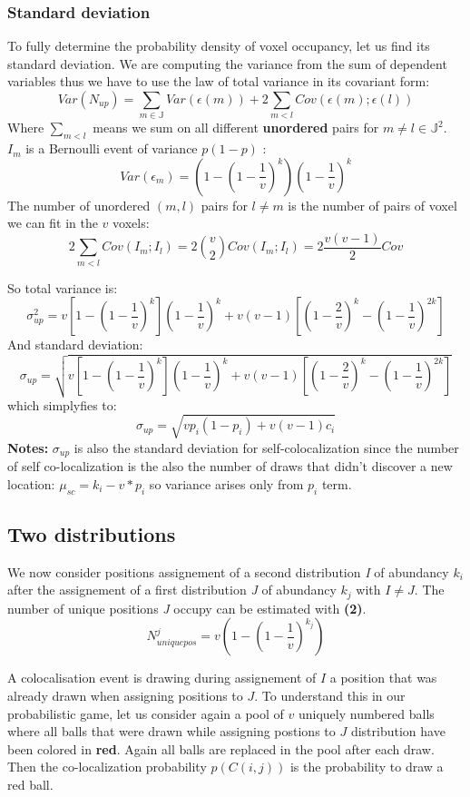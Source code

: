 \documentclass{article}
\begin{document}
\subsubsection{Standard deviation}
To fully determine the probability density of voxel occupancy, let us find its standard deviation. We are computing the variance from the sum of dependent variables
thus we have to use the law of total variance in its covariant form:
\[
Var(N_{up}) = \sum_{m \in \mathbb{J}} Var(\epsilon(m)) +  2\sum_{m < l }Cov(\epsilon(m);\epsilon(l))
\]
Where $\sum_{m<l}$ means we sum on all different \textbf{unordered} pairs for $m \neq l \in \mathbb{J}^2$.\newline
$I_m$ is a Bernoulli event of variance $p(1-p)$ :
\[
Var(\epsilon_m) = (1-(1-\frac{1}{v})^k)(1-\frac{1}{v})^k
\]
The number of unordered $(m,l)$ pairs for $l \neq m$ is the number of pairs of voxel we can fit in the $v$ voxels: 
\[
    2\sum_{m < l }Cov(I_m;I_l) = 2\binom{v}{2}Cov(I_m;I_l) = 2\frac{v(v-1)}{2}Cov 
\]

So total variance is:
\[
    \sigma^2_{up} = v[1-{(1-\frac{1}{v})}^k]{(1-\frac{1}{v})}^k + v(v-1)[(1-\frac{2}{v})^k - (1-\frac{1}{v})^{2k}]
\]
And standard deviation:
\[
    \sigma_{up} = \sqrt{v[1-{(1-\frac{1}{v})}^k]{(1-\frac{1}{v})}^k + v(v-1)[(1-\frac{2}{v})^k - (1-\frac{1}{v})^{2k}]}
\]
which simplyfies to:
\begin{equation}
    \sigma_{up} = \sqrt{vp_i(1-p_i) + v(v-1)c_i}
\end{equation}
\textbf{Notes:} $\sigma_{up}$ is also the standard deviation for self-colocalization since the number of self co-localization is the also the number
of draws that didn't discover a new location: $\mu_{sc} = k_i - v*p_i$ so variance arises only from $p_i$ term.


\newpage
\subsection{Two distributions}
We now consider positions assignement of a second distribution \textit{I} of abundancy $ k_i $ after the assignement of a first 
distribution \textit{J} of abundancy $ k_j $ with $ I \neq J $. The number of unique positions \textit{J} occupy can be estimated with
\textbf{(2)}.
\[
N^j_{uniquepos} = v(1-(1-\frac{1}{v})^{k_j})
\]

A colocalisation event is drawing during assignement of $I$ a position that was already drawn when assigning positions to $J$. To
understand this in our probabilistic game, let us consider again a pool of $v$ uniquely numbered balls where all balls that were 
drawn while assigning postions to $J$ distribution have been colored in \textbf{red}. Again all balls are replaced in the pool after
each draw. Then the co-localization probability $p(C(i,j))$ is the
probability to draw a red ball.
\end{document}
